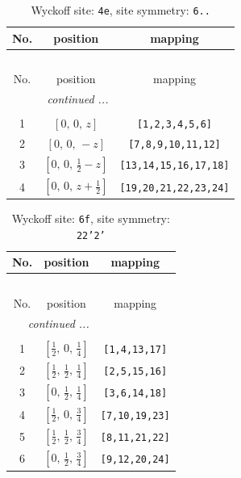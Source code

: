 \documentclass[fleqn,8pt]{jsarticle}
\begin{document}
\renewcommand{\arraystretch}{1.2}
\begin{longtable}{ccc}
\caption{Wyckoff site: {\tt 4e}, site symmetry: {\tt 6..}}
 \\
 \hline \hline
No. & position & mapping \\ \hline \endfirsthead

\multicolumn{2}{l}{\tablename\ \thetable{}} \\
 \hline \hline
No. & position & mapping \\ \hline \endhead

 \hline \hline
\multicolumn{2}{r}{\footnotesize\it continued ...} \\ \endfoot

 \hline \hline
\multicolumn{2}{r}{} \\ \endlastfoot

1 & $\left[ 0,\, 0,\, z \right]$ & {\tt [1,2,3,4,5,6]} \\ \hline
2 & $\left[ 0,\, 0,\, - z \right]$ & {\tt [7,8,9,10,11,12]} \\ \hline
3 & $\left[ 0,\, 0,\, \frac{1}{2} - z \right]$ & {\tt [13,14,15,16,17,18]} \\ \hline
4 & $\left[ 0,\, 0,\, z + \frac{1}{2} \right]$ & {\tt [19,20,21,22,23,24]} \\
\end{longtable}
\renewcommand{\arraystretch}{1.2}
\begin{longtable}{ccc}
\caption{Wyckoff site: {\tt 6f}, site symmetry: {\tt 22'2'}}
 \\
 \hline \hline
No. & position & mapping \\ \hline \endfirsthead

\multicolumn{2}{l}{\tablename\ \thetable{}} \\
 \hline \hline
No. & position & mapping \\ \hline \endhead

 \hline \hline
\multicolumn{2}{r}{\footnotesize\it continued ...} \\ \endfoot

 \hline \hline
\multicolumn{2}{r}{} \\ \endlastfoot

1 & $\left[ \frac{1}{2},\, 0,\, \frac{1}{4} \right]$ & {\tt [1,4,13,17]} \\ \hline
2 & $\left[ \frac{1}{2},\, \frac{1}{2},\, \frac{1}{4} \right]$ & {\tt [2,5,15,16]} \\ \hline
3 & $\left[ 0,\, \frac{1}{2},\, \frac{1}{4} \right]$ & {\tt [3,6,14,18]} \\ \hline
4 & $\left[ \frac{1}{2},\, 0,\, \frac{3}{4} \right]$ & {\tt [7,10,19,23]} \\ \hline
5 & $\left[ \frac{1}{2},\, \frac{1}{2},\, \frac{3}{4} \right]$ & {\tt [8,11,21,22]} \\ \hline
6 & $\left[ 0,\, \frac{1}{2},\, \frac{3}{4} \right]$ & {\tt [9,12,20,24]} \\
\end{longtable}
\end{document}
